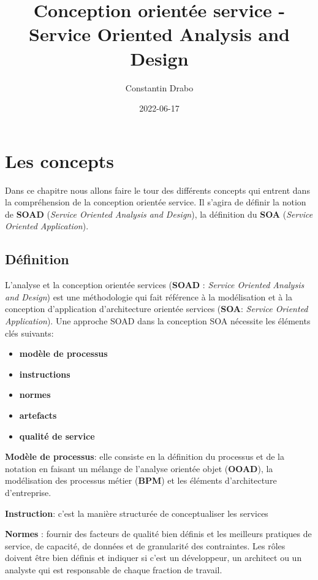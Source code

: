 \documentclass[
]{book}
\title{Conception orientée service - Service Oriented Analysis and Design}
\author{Constantin Drabo}
\date{2022-06-17}
\providecommand{\tightlist}{%
  \setlength{\itemsep}{0pt}\setlength{\parskip}{0pt}}
\theoremstyle{definition}
\theoremstyle{definition}
\theoremstyle{definition}
\theoremstyle{definition}
\theoremstyle{remark}
\begin{document}
\maketitle

{
\setcounter{tocdepth}{1}
\tableofcontents
}
\hypertarget{les-concepts}{%
\chapter{Les concepts}\label{les-concepts}}

Dans ce chapitre nous allons faire le tour des différents concepts qui entrent dans la compréhension de la conception orientée service. Il s'agira de définir la notion de \textbf{SOAD} (\emph{Service Oriented Analysis and Design}), la définition du \textbf{SOA} (\emph{Service Oriented Application}).

\hypertarget{duxe9finition}{%
\section{Définition}\label{duxe9finition}}

L'analyse et la conception orientée services (\textbf{SOAD} : \emph{Service Oriented Analysis and Design}) est une méthodologie qui fait référence à la modélisation et à la conception d'application d'architecture orientée services (\textbf{SOA}: \emph{Service Oriented Application}). Une approche SOAD dans la conception SOA nécessite les éléments clés suivants:

\begin{itemize}
\tightlist
\item
  \textbf{modèle de processus}
\item
  \textbf{instructions}
\item
  \textbf{normes}
\item
  \textbf{artefacts}
\item
  \textbf{qualité de service}
\end{itemize}

\textbf{Modèle de processus}: elle consiste en la définition du processus et de la notation en faisant un mélange de l'analyse orientée objet (\textbf{OOAD}), la modélisation des processus métier (\textbf{BPM}) et les éléments d'architecture d'entreprise.

\textbf{Instruction}: c'est la manière structurée de conceptualiser les services

\textbf{Normes} : fournir des facteurs de qualité bien définis et les meilleurs pratiques de service, de capacité, de données et de granularité des contraintes. Les rôles doivent être bien définis et indiquer si c'est un développeur, un architect ou un analyste qui est responsable de chaque fraction de travail.
\end{document}
